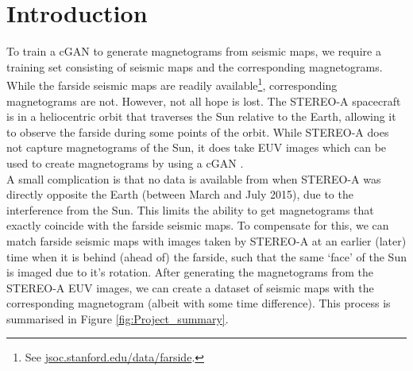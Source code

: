 \documentclass[11pt,a4paper,onecolumn]{report}
\begin{document}



\tableofcontents


\listoffigures







%
%
%
%
\chapter{Introduction}
%
%
%
%





%
%

To train a cGAN to generate magnetograms from seismic maps, we require a
training set consisting of seismic maps and the corresponding magnetograms.
While the farside seismic maps are readily available\footnote{See
  \url{jsoc.stanford.edu/data/farside}.}, corresponding magnetograms are
not. However, not all hope is lost. The STEREO-A spacecraft is in a heliocentric
orbit that traverses the Sun relative to the Earth, allowing it to observe the
farside during some points of the orbit. While STEREO-A does not capture
magnetograms of the Sun, it does take EUV images which can be used to create
magnetograms by using a cGAN \citep{Kim2019}.\\

A small complication is that no data is available from when STEREO-A was
directly opposite the Earth (between March and July 2015), due to the
interference from the Sun. This limits the ability to get magnetograms that
exactly coincide with the farside seismic maps. To compensate for this, we can
match farside seismic maps with images taken by STEREO-A at an earlier (later)
time when it is behind (ahead of) the farside, such that the same `face' of the
Sun is imaged due to it's rotation. After generating the magnetograms from the
STEREO-A EUV images, we can create a dataset of seismic maps with the
corresponding magnetogram (albeit with some time difference). This process is
summarised in Figure \ref{fig:Project_summary}.\\
\end{document}

